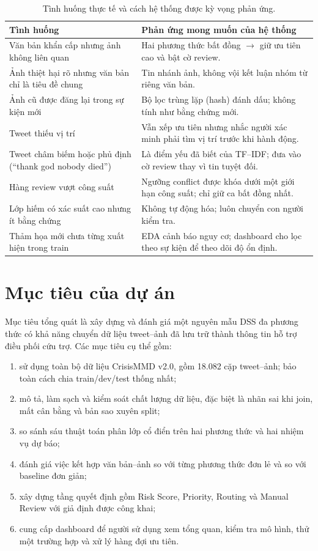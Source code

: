 \begin{table}[H]
\centering
\small
\caption{Tình huống thực tế và cách hệ thống được kỳ vọng phản ứng.}
\label{tab:scenarios}
\begin{tabularx}{\textwidth}{p{5cm}X}
\toprule
\textbf{Tình huống} & \textbf{Phản ứng mong muốn của hệ thống}\\
\midrule
Văn bản khẩn cấp nhưng ảnh không liên quan &
Hai phương thức bất đồng $\rightarrow$ giữ ưu tiên cao và bật cờ review.\\
Ảnh thiệt hại rõ nhưng văn bản chỉ là tiêu đề chung &
Tin nhánh ảnh, không vội kết luận nhóm từ riêng văn bản.\\
Ảnh cũ được đăng lại trong sự kiện mới &
Bộ lọc trùng lặp (hash) đánh dấu; không tính như bằng chứng mới.\\
Tweet thiếu vị trí &
Vẫn xếp ưu tiên nhưng nhắc người xác minh phải tìm vị trí trước khi hành động.\\
Tweet châm biếm hoặc phủ định (``thank god nobody died'') &
Là điểm yếu đã biết của TF--IDF; đưa vào cờ review thay vì tin tuyệt đối.\\
Hàng review vượt công suất &
Ngưỡng conflict được khóa dưới một giới hạn công suất; chỉ giữ ca bất đồng nhất.\\
Lớp hiếm có xác suất cao nhưng ít bằng chứng &
Không tự động hóa; luôn chuyển con người kiểm tra.\\
Thảm họa mới chưa từng xuất hiện trong train &
EDA cảnh báo nguy cơ; dashboard cho lọc theo sự kiện để theo dõi độ ổn định.\\
\bottomrule
\end{tabularx}
\end{table}

\section{Mục tiêu của dự án}

Mục tiêu tổng quát là xây dựng và đánh giá một nguyên mẫu DSS đa phương thức có
khả năng chuyển dữ liệu tweet--ảnh đã lưu trữ thành thông tin hỗ trợ điều phối
cứu trợ. Các mục tiêu cụ thể gồm:

\begin{enumerate}[leftmargin=*]
  \item sử dụng toàn bộ dữ liệu CrisisMMD v2.0, gồm 18.082 cặp tweet--ảnh;
        bảo toàn cách chia train/dev/test thống nhất;
  \item mô tả, làm sạch và kiểm soát chất lượng dữ liệu, đặc biệt là nhãn sai
        khi join, mất cân bằng và bản sao xuyên split;
  \item so sánh sáu thuật toán phân lớp cổ điển trên hai phương thức và hai
        nhiệm vụ dự báo;
  \item đánh giá việc kết hợp văn bản--ảnh so với từng phương thức đơn lẻ và so
        với baseline đơn giản;
  \item xây dựng tầng quyết định gồm Risk Score, Priority, Routing và Manual
        Review với giả định được công khai;
  \item cung cấp dashboard để người sử dụng xem tổng quan, kiểm tra mô hình, thử
        một trường hợp và xử lý hàng đợi ưu tiên.
\end{enumerate}

